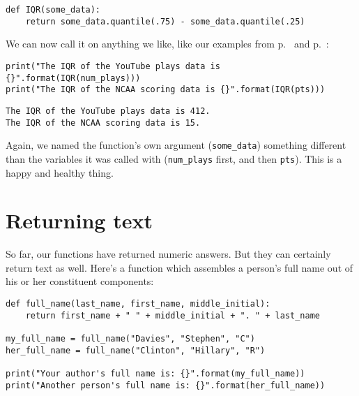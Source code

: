 \begin{Verbatim}[fontsize=\footnotesize,samepage=true,frame=single,framesep=3mm]
def IQR(some_data):
    return some_data.quantile(.75) - some_data.quantile(.25)
\end{Verbatim}

We can now call it on anything we like, like our examples from
p.~\pageref{YouTubeData} and p.~\pageref{NCAAData}:

\begin{Verbatim}[fontsize=\scriptsize,samepage=true,frame=single,framesep=3mm]
print("The IQR of the YouTube plays data is {}".format(IQR(num_plays)))
print("The IQR of the NCAA scoring data is {}".format(IQR(pts)))
\end{Verbatim}
\vspace{-.2in}

\begin{Verbatim}[fontsize=\small,samepage=true,frame=leftline,framesep=5mm,framerule=1mm]
The IQR of the YouTube plays data is 412.
The IQR of the NCAA scoring data is 15.
\end{Verbatim}

Again, we named the function's own argument (\texttt{some\_data}) something
different than the variables it was called with (\texttt{num\_plays} first, and
then \texttt{pts}). This is a happy and healthy thing.

\section{Returning text}

So far, our functions have returned numeric answers. But they can certainly
return text as well. Here's a function which assembles a person's full name out
of his or her constituent components:

\begin{Verbatim}[fontsize=\footnotesize,samepage=true,frame=single,framesep=3mm]
def full_name(last_name, first_name, middle_initial):
    return first_name + " " + middle_initial + ". " + last_name

my_full_name = full_name("Davies", "Stephen", "C")
her_full_name = full_name("Clinton", "Hillary", "R")

print("Your author's full name is: {}".format(my_full_name))
print("Another person's full name is: {}".format(her_full_name))
\end{Verbatim}
\vspace{-.5in}

